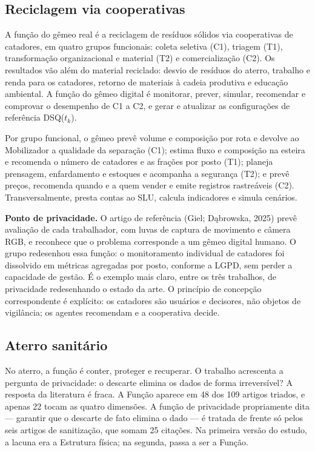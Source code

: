 \documentclass[12pt,a4paper,article,oneside,english,brazil]{abntex2}
\newcommand{\dsq}[1]{DSQ($t_{#1}$)}
\begin{document}
\subsection{Reciclagem via cooperativas}

A função do gêmeo real é a reciclagem de resíduos sólidos via cooperativas de catadores, em quatro grupos funcionais: coleta seletiva (C1), triagem (T1), transformação organizacional e material (T2) e comercialização (C2). Os resultados vão além do material reciclado: desvio de resíduos do aterro, trabalho e renda para os catadores, retorno de materiais à cadeia produtiva e educação ambiental. A função do gêmeo digital é monitorar, prever, simular, recomendar e comprovar o desempenho de C1 a C2, e gerar e atualizar as configurações de referência \dsq{k}.

Por grupo funcional, o gêmeo prevê volume e composição por rota e devolve ao Mobilizador a qualidade da separação (C1); estima fluxo e composição na esteira e recomenda o número de catadores e as frações por posto (T1); planeja prensagem, enfardamento e estoques e acompanha a segurança (T2); e prevê preços, recomenda quando e a quem vender e emite registros rastreáveis (C2). Transversalmente, presta contas ao SLU, calcula indicadores e simula cenários.

\textbf{Ponto de privacidade.} O artigo de referência (Giel; Dąbrowska, 2025) prevê avaliação de cada trabalhador, com luvas de captura de movimento e câmera RGB, e reconhece que o problema corresponde a um gêmeo digital humano. O grupo redesenhou essa função: o monitoramento individual de catadores foi dissolvido em métricas agregadas por posto, conforme a LGPD, sem perder a capacidade de gestão. É o exemplo mais claro, entre os três trabalhos, de privacidade redesenhando o estado da arte. O princípio de concepção correspondente é explícito: os catadores são usuários e decisores, não objetos de vigilância; os agentes recomendam e a cooperativa decide.

\subsection{Aterro sanitário}

No aterro, a função é conter, proteger e recuperar. O trabalho acrescenta a pergunta de privacidade: o descarte elimina os dados de forma irreversível? A resposta da literatura é fraca. A Função aparece em 48 dos 109 artigos triados, e apenas 22 tocam as quatro dimensões. A função de privacidade propriamente dita --- garantir que o descarte de fato elimina o dado --- é tratada de frente só pelos seis artigos de sanitização, que somam 25 citações. Na primeira versão do estudo, a lacuna era a Estrutura física; na segunda, passa a ser a Função.
\end{document}
